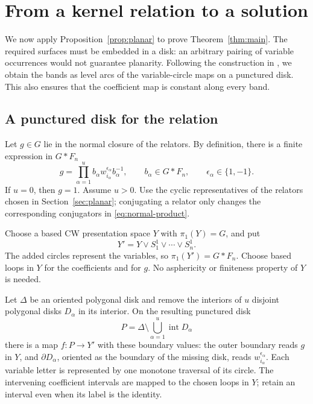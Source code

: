 \section{From a kernel relation to a solution}
\label{sec:kernel}

We now apply Proposition~\ref{prop:planar} to prove
Theorem~\ref{thm:main}. The required surfaces must be embedded in a disk:
an arbitrary pairing of variable occurrences would not guarantee
planarity. Following the construction in
\cite[Section~5]{OpenAIKervaire2026}, we obtain the bands as level arcs
of the variable-circle maps on a punctured disk. This also ensures that the coefficient map is
constant along every band.

\subsection{A punctured disk for the relation}

Let $g\in G$ lie in the normal closure of the relators. By definition,
there is a finite expression in $G*F_n$
\begin{equation}\label{eq:normal-product}
 g=\prod_{\alpha=1}^{u}
       b_\alpha w_{i_\alpha}^{\epsilon_\alpha}b_\alpha^{-1},
 \qquad b_\alpha\in G*F_n,\qquad\epsilon_\alpha\in\{1,-1\}.
\end{equation}
If $u=0$, then $g=1$. Assume $u>0$. Use the cyclic representatives
of the relators chosen in Section~\ref{sec:planar}; conjugating a
relator only changes the corresponding conjugators in
\eqref{eq:normal-product}.

Choose a based CW presentation space $Y$ with $\pi_1(Y)=G$, and put
\[
 Y'=Y\vee S^1_1\vee\cdots\vee S^1_n.
\]
The added circles represent the variables, so $\pi_1(Y')=G*F_n$.
Choose based loops in $Y$ for the coefficients and for $g$. No
asphericity or finiteness property of $Y$ is needed.

Let $\Delta$ be an oriented polygonal disk and remove the interiors
of $u$ disjoint polygonal disks $D_\alpha$ in its interior. On the
resulting punctured disk
\[
 P=\Delta\setminus\bigcup_{\alpha=1}^{u}\operatorname{int}D_\alpha
\]
there is a map $f:P\to Y'$ with these boundary values: the outer
boundary reads $g$ in $Y$, and $\partial D_\alpha$, oriented as the
boundary of the missing disk, reads
$w_{i_\alpha}^{\epsilon_\alpha}$. Each variable letter is represented
by one monotone traversal of its circle. The intervening coefficient
intervals are mapped to the chosen loops in $Y$; retain an interval
even when its label is the identity.

